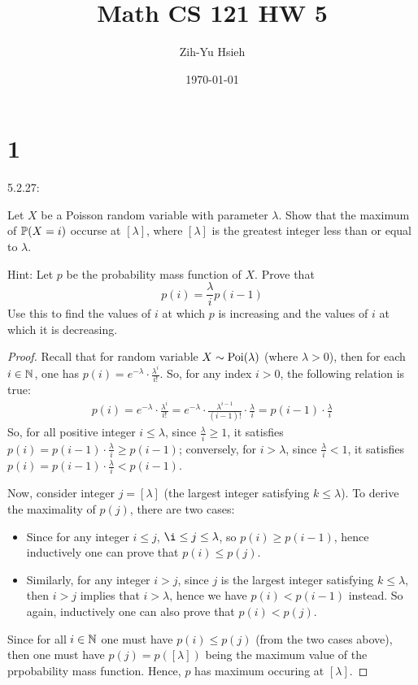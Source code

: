 \documentclass{article}
\title{Math CS 121 HW 5}
\author{Zih-Yu Hsieh}
\date{\today}
\begin{document}
\maketitle

\section*{1}
\begin{ques}\label{q1}
    5.2.27:

    Let $X$ be a Poisson random variable with parameter $\lambda$. Show that the maximum of $\mathbb{P}(X=i)$ occurse at $[\lambda]$, where $[\lambda]$ is the greatest integer less than or equal to $\lambda$.

    Hint: Let $p$ be the probability mass function of $X$. Prove that 
    $$p(i)=\frac{\lambda}{i}p(i-1)$$ 
    Use this to find the values of $i$ at which $p$ is increasing and the values of $i$ at which it is decreasing.
\end{ques}

\begin{proof}
    Recall that for random variable $X\sim \mathrm{Poi}(\lambda)$ (where $\lambda>0$), then for each $i\in\mathbb{N}$, one has $p(i)=e^{-\lambda}\cdot\frac{\lambda^i}{i!}$.  So, for any index $i>0$, the following relation is true:
    \begin{align}
        p(i) = e^{-\lambda}\cdot\frac{\lambda^i}{i!} = e^{-\lambda}\cdot\frac{\lambda^{i-1}}{(i-1)!}\cdot\frac{\lambda}{i} = p(i-1)\cdot\frac{\lambda}{i}
    \end{align}
    So, for all positive integer $i\leq \lambda$, since $\frac{\lambda}{i}\geq 1$, it satisfies $p(i) = p(i-1)\cdot\frac{\lambda}{i}\geq p(i-1)$; conversely, for $i>\lambda$, since $\frac{\lambda}{i}<1$, it satisfies $p(i)=p(i-1)\cdot\frac{\lambda}{i}<p(i-1)$.

    \hfil

    Now, consider integer $j=[\lambda]$ (the largest integer satisfying $k\leq \lambda$). To derive the maximality of $p(j)$, there are two cases:
    \begin{itemize}
        \item Since for any integer $i\leq j$, $\i\leq j\leq \lambda$, so $p(i)\geq p(i-1)$, hence inductively one can prove that $p(i)\leq p(j)$.
        \item Similarly, for any integer $i>j$, since $j$ is the largest integer satisfying $k\leq \lambda$, then $i>j$ implies that $i>\lambda$, hence we have $p(i)<p(i-1)$ instead. So again, inductively one can also prove that $p(i)<p(j)$.
    \end{itemize}

    Since for all $i\in\mathbb{N}$ one must have $p(i)\leq p(j)$ (from the two cases above), then one must have $p(j) = p([\lambda])$ being the maximum value of the prpobability mass function. Hence, $p$ has maximum occuring at $[\lambda]$.
\end{proof}
\end{document}
